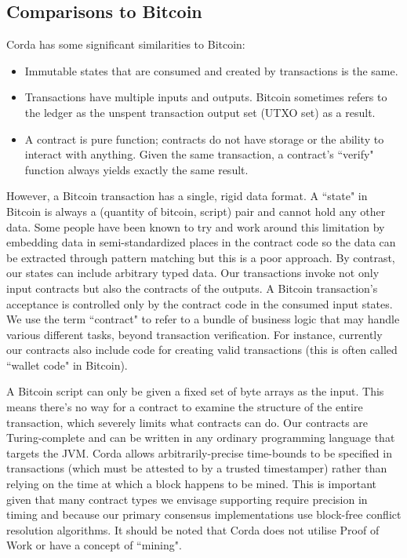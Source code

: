 \documentclass{article}
\begin{document}
\subsection{Comparisons to Bitcoin}
Corda has some significant similarities to Bitcoin: 
\begin{itemize}
\item{Immutable states that are consumed and created by transactions is the same.}
\item{Transactions have multiple inputs and outputs. Bitcoin sometimes refers to the ledger as the unspent transaction output set (UTXO set) as a result.}
\item{A contract is pure function; contracts do not have storage or the ability to interact with anything. Given the same transaction, a contract's ``verify" function always yields exactly the same result.}
\end{itemize}

However, a Bitcoin transaction has a single, rigid data format. A ``state" in Bitcoin is always a (quantity of bitcoin, script) pair and cannot hold any other data. Some people have been known to try and work around this limitation by embedding data in semi-standardized places in the contract code so the data can be extracted through pattern matching but this is a poor approach. By contrast, our states can include arbitrary typed data. Our transactions invoke not only input contracts but also the contracts of the outputs. A Bitcoin transaction's acceptance is controlled only by the contract code in the consumed input states. We use the term ``contract" to refer to a bundle of business logic that may handle various different tasks, beyond transaction verification. For instance, currently our contracts also include code for creating valid transactions (this is often called ``wallet code" in Bitcoin).

A Bitcoin script can only be given a fixed set of byte arrays as the input. This means there's no way for a contract to examine the structure of the entire transaction, which severely limits what contracts can do. Our contracts are Turing-complete and can be written in any ordinary programming language that targets the JVM.	
Corda allows arbitrarily-precise time-bounds to be specified in transactions (which must be attested to by a trusted timestamper) rather than relying on the time at which a block happens to be mined.  This is important given that many contract types we envisage supporting require precision in timing and because our primary consensus implementations use block-free conflict resolution algorithms. It should be noted that Corda does not utilise Proof of Work or have a concept of ``mining".
\end{document}

